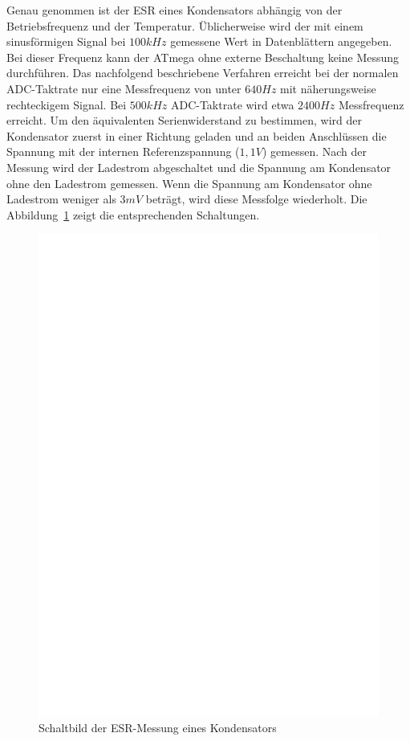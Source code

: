 Genau genommen ist der ESR eines Kondensators abhängig von der Betriebsfrequenz und der Temperatur.
Üblicherweise wird der mit einem sinusförmigen Signal bei \(100kHz\) gemessene Wert in Datenblättern angegeben.
Bei dieser Frequenz kann der ATmega ohne externe Beschaltung keine Messung durchführen.
Das nachfolgend beschriebene Verfahren erreicht bei der normalen ADC-Taktrate nur eine Messfrequenz von unter \(640Hz\)
 mit näherungsweise rechteckigem Signal. Bei \(500 kHz\) ADC-Taktrate wird etwa \(2400Hz\) Messfrequenz erreicht.
Um den äquivalenten Serienwiderstand zu bestimmen,
 wird der Kondensator zuerst in einer Richtung geladen und an beiden Anschlüssen die Spannung mit der internen
Referenzspannung (\(1,1V\)) gemessen.
Nach der Messung wird der Ladestrom abgeschaltet und die Spannung am Kondensator ohne den
Ladestrom gemessen. Wenn die Spannung am Kondensator ohne Ladestrom weniger als \(3mV\) beträgt, wird
diese Messfolge wiederholt.
Die Abbildung~\ref{fig:Cap_esr} zeigt die entsprechenden Schaltungen.

\begin{figure}[H]
  \centering
    \includegraphics[]{../FIG/Cap_esr.eps}
  \caption{Schaltbild der ESR-Messung eines Kondensators}
  \label{fig:Cap_esr}
\end{figure}

